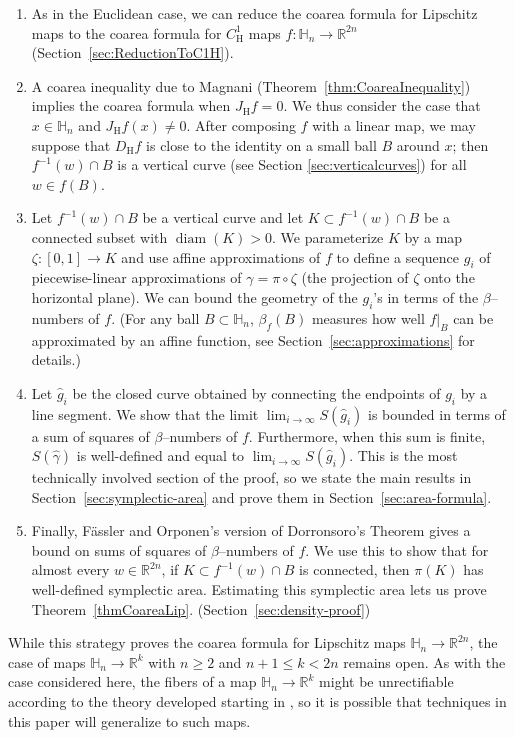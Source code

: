 \documentclass[12pt,reqno]{amsart}
\newcommand{\JfH}{J_\mathrm{H}f}
\newcommand{\DfH}{D_\mathrm{H}f}
\newcommand{\HH}{\mathbb{H}}
\newcommand{\R}{\mathbb{R}}
\newcommand{\from}{\colon}
\theoremstyle{remark}
\newcommand{\0}{\mathbf{0}}
\renewcommand{\1}{\mathbf 1}
\DeclareMathOperator{\diam}{diam}
\begin{document}
\begin{enumerate}
\item As in the Euclidean case, we can reduce the coarea formula for Lipschitz maps to the coarea formula for $C^1_\mathrm{H}$ maps $f\from \HH_n\to \R^{2n}$ (Section~\ref{sec:ReductionToC1H}). 
\item A coarea inequality due to Magnani \cite{MagnaniCoareaInequality} (Theorem~\ref{thm:CoareaInequality}) implies the coarea formula when $\JfH = 0$. 
We thus consider the case that $x\in \HH_n$ and $\JfH(x) \ne 0$. After composing $f$ with a linear map, we may suppose that $\DfH$ is close to the identity on a small ball $B$ around $x$; then $f^{-1}(w)\cap B$ is a vertical curve (see Section \ref{sec:verticalcurves}) for all $w\in f(B)$.
\item Let $f^{-1}(w)\cap B$ be a vertical curve and let $K\subset f^{-1}(w)\cap B$ be a connected subset with $\diam(K)>0$. We parameterize $K$ by a map $\zeta\from [0,1]\to K$ and use affine approximations of $f$ to define a sequence $g_i$ of piecewise-linear approximations of $\gamma = \pi\circ \zeta$ (the projection of $\zeta$ onto the horizontal plane). We can bound the geometry of the $g_i$'s in terms of the $\beta$--numbers of $f$. (For any ball $B\subset \HH_n$, $\beta_f(B)$ measures how well $f|_B$ can be approximated by an affine function, see Section~\ref{sec:approximations} for details.)
\item Let $\hat g_i$ be the closed curve obtained by connecting the endpoints of $g_i$ by a line segment. We show that the limit $\lim_{i\to \infty} S(\hat g_i)$ is bounded in terms of a sum of squares of $\beta$--numbers of $f$. Furthermore, when this sum is finite, $S(\hat\gamma)$ is well-defined and equal to $\lim_{i\to \infty} S(\hat g_i)$. This is the most technically involved section of the proof, so we state the main results in Section~\ref{sec:symplectic-area} and prove them in Section~\ref{sec:area-formula}.
\item Finally, Fässler and Orponen's version of Dorronsoro's Theorem \cite{FO-Dorronsoro} gives a bound on sums of squares of $\beta$--numbers of $f$. We use this to show that for almost every $w\in \R^{2n}$, if $K\subset f^{-1}(w)\cap B$ is connected, then $\pi(K)$ has well-defined symplectic area. Estimating this symplectic area lets us prove Theorem~\ref{thmCoareaLip}. (Section~\ref{sec:density-proof})


\end{enumerate}

While this strategy proves the coarea formula for Lipschitz maps $\HH_n\to \mathbb R^{2n}$, the case of maps $\HH_n\to \mathbb R^{k}$ with $n\ge 2$ and $n+1\le k < 2n$ remains open. As with the case considered here, the fibers of a map $\HH_n\to \mathbb R^{k}$ might be unrectifiable according to the theory developed starting in \cite{FSSCMathAnn}, so it is possible that techniques in this paper will generalize to such maps.
\end{document}
